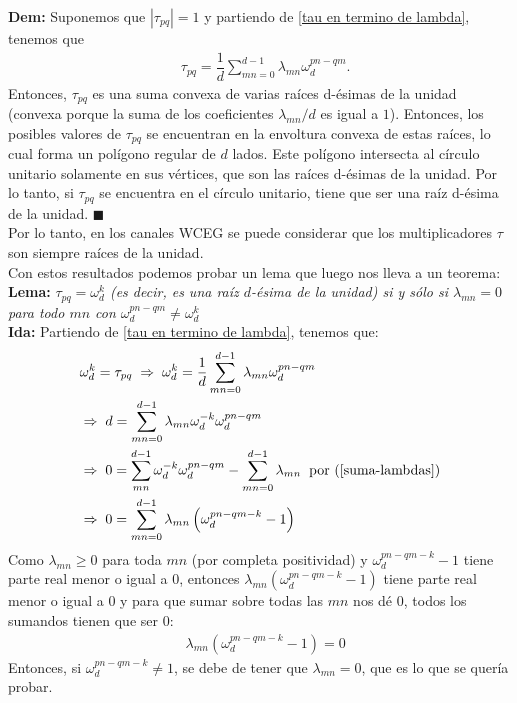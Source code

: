 \textbf{Dem:} Suponemos que $|\tau_{pq}|=1 $ y partiendo de \ref{tau en termino de lambda}, tenemos que
\begin{align*}
& \tau_{pq} = \dfrac{1}{d} \sum_{mn=0}^{d-1} \lambda_{mn} \omega_d^{pn-qm} .
\end{align*}
Entonces, $\tau_{pq}$ es una suma convexa de varias raíces d-ésimas de la unidad (convexa porque la suma de los coeficientes $\lambda_{mn}/d$ es igual a $1$). Entonces, los posibles valores de $\tau_{pq}$ se encuentran en la envoltura convexa de estas raíces, lo cual forma un polígono regular de $d$ lados. Este polígono intersecta al círculo unitario solamente en sus vértices, que son las raíces d-ésimas de la unidad. Por lo tanto, si $\tau_{pq}$ se encuentra en el círculo unitario, tiene que ser una raíz d-ésima de la unidad.  $ \blacksquare$  \\

Por lo tanto, en los canales WCEG se puede considerar que los multiplicadores $\tau$ son siempre raíces de la unidad. \\

Con estos resultados podemos probar un lema que luego nos lleva a un teorema:\\




\textbf{Lema:} \textit{$\tau_{pq} = \omega_d^k$ (es decir, es una raíz $d$-ésima de la unidad) si  y sólo si $\lambda_{mn} = 0$ para todo $mn$ con $\omega_d^{pn-qm} \neq \omega_d^k$} \\

\textbf{Ida:}  Partiendo de \ref{tau en termino de lambda}, tenemos que:
\begin{align*}
& \omega_d^k = \tau_{pq}  \; \Rightarrow \; \omega_d^k = \dfrac{1}{d} \sum_{mn=0}^{d-1} \lambda_{mn} \omega_d^{pn-qm} \\
& \Rightarrow \; d = \sum_{mn=0}^{d-1} \lambda_{mn} \omega_d^{-k} \omega_d^{pn-qm} \\
& \Rightarrow \; 0 = \sum_{mn}^{d-1} \omega_d^{-k} \omega_d^{pn-qm} - \sum_{mn=0}^{d-1}\lambda_{mn} \;\; \text{por (\ref{suma-lambdas})} \\
& \Rightarrow \; 0 = \sum_{mn=0}^{d-1} \lambda_{mn} \left( \omega_d^{pn-qm-k} - 1 \right) 
\end{align*}
Como $\lambda_{mn} \geq 0$ para toda $mn$ (por completa positividad) y $\omega_d^{pn-qm-k} - 1$ tiene parte real menor o igual a $0$, entonces $\lambda_{mn} \left( \omega_d^{pn-qm-k} - 1 \right) $ tiene parte real menor o igual a $0$ y para que sumar sobre todas las $mn$ nos dé $0$, todos los sumandos tienen que ser $0$:
\begin{align*}
& \lambda_{mn} \left( \omega_d^{pn-qm-k} - 1 \right) = 0
\end{align*}
Entonces, si $\omega_d^{pn-qm-k} \neq 1$, se debe de tener que $\lambda_{mn} = 0$, que es lo que se quería probar. \\

